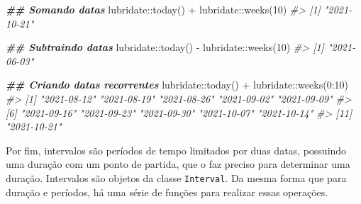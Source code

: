 \documentclass[
]{book}
\newenvironment{Shaded}{\begin{snugshade}}{\end{snugshade}}
\newcommand{\CommentTok}[1]{\textcolor[rgb]{0.37,0.37,0.37}{\textit{#1}}}
\newcommand{\DecValTok}[1]{\textcolor[rgb]{0.06,0.06,0.06}{#1}}
\newcommand{\DocumentationTok}[1]{\textcolor[rgb]{0.37,0.37,0.37}{\textbf{\textit{#1}}}}
\newcommand{\FunctionTok}[1]{\textcolor[rgb]{0,0,0}{#1}}
\newcommand{\NormalTok}[1]{#1}
\newcommand{\SpecialCharTok}[1]{\textcolor[rgb]{0,0,0}{#1}}
\begin{document}
\begin{Shaded}
\begin{Highlighting}[]
\DocumentationTok{\#\# Somando datas}
\NormalTok{lubridate}\SpecialCharTok{::}\FunctionTok{today}\NormalTok{() }\SpecialCharTok{+}\NormalTok{ lubridate}\SpecialCharTok{::}\FunctionTok{weeks}\NormalTok{(}\DecValTok{10}\NormalTok{)}
\CommentTok{\#\textgreater{} [1] "2021{-}10{-}21"}

\DocumentationTok{\#\# Subtraindo datas}
\NormalTok{lubridate}\SpecialCharTok{::}\FunctionTok{today}\NormalTok{() }\SpecialCharTok{{-}}\NormalTok{ lubridate}\SpecialCharTok{::}\FunctionTok{weeks}\NormalTok{(}\DecValTok{10}\NormalTok{)}
\CommentTok{\#\textgreater{} [1] "2021{-}06{-}03"}

\DocumentationTok{\#\# Criando datas recorrentes}
\NormalTok{lubridate}\SpecialCharTok{::}\FunctionTok{today}\NormalTok{() }\SpecialCharTok{+}\NormalTok{ lubridate}\SpecialCharTok{::}\FunctionTok{weeks}\NormalTok{(}\DecValTok{0}\SpecialCharTok{:}\DecValTok{10}\NormalTok{)}
\CommentTok{\#\textgreater{}  [1] "2021{-}08{-}12" "2021{-}08{-}19" "2021{-}08{-}26" "2021{-}09{-}02" "2021{-}09{-}09"}
\CommentTok{\#\textgreater{}  [6] "2021{-}09{-}16" "2021{-}09{-}23" "2021{-}09{-}30" "2021{-}10{-}07" "2021{-}10{-}14"}
\CommentTok{\#\textgreater{} [11] "2021{-}10{-}21"}
\end{Highlighting}
\end{Shaded}

Por fim, intervalos são períodos de tempo limitados por duas datas, possuindo uma duração com um ponto de partida, que o faz preciso para determinar uma duração. Intervalos são objetos da classe \texttt{Interval}. Da mesma forma que para duração e períodos, há uma série de funções para realizar essas operações.
\end{document}
